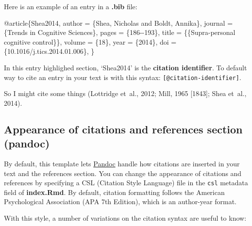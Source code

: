 \documentclass[a4paper, nobind]{templates/ociamthesis}
\newenvironment{Shaded}{\begin{snugshade}}{\end{snugshade}}
\newcommand{\DataTypeTok}[1]{\textcolor[rgb]{0.13,0.29,0.53}{#1}}
\newcommand{\NormalTok}[1]{#1}
\newcommand{\OtherTok}[1]{\textcolor[rgb]{0.56,0.35,0.01}{#1}}
\newcommand{\VariableTok}[1]{\textcolor[rgb]{0.00,0.00,0.00}{#1}}
\renewenvironment{Shaded}
{
  \vspace{10pt}%
  \begin{snugshade}%
}{%
  \end{snugshade}%
  \vspace{8pt}%
}
\providecommand{\citeproc}[2]{#2}
\begin{document}
Here is an example of an entry in a \textbf{.bib} file:

\begin{Shaded}
\begin{Highlighting}[]
\VariableTok{@article}\NormalTok{\{}\OtherTok{Shea2014}\NormalTok{,}
  \DataTypeTok{author}\NormalTok{ =        \{Shea, Nicholas and Boldt, Annika\},}
  \DataTypeTok{journal}\NormalTok{ =       \{Trends in Cognitive Sciences\},}
  \DataTypeTok{pages}\NormalTok{ =         \{186{-}{-}193\},}
  \DataTypeTok{title}\NormalTok{ =         \{\{Supra{-}personal cognitive control\}\},}
  \DataTypeTok{volume}\NormalTok{ =        \{18\},}
  \DataTypeTok{year}\NormalTok{ =          \{2014\},}
  \DataTypeTok{doi}\NormalTok{ =           \{10.1016/j.tics.2014.01.006\},}
\NormalTok{\}}
\end{Highlighting}
\end{Shaded}

In this entry highlighed section, `Shea2014' is the \textbf{citation identifier}.
To default way to cite an entry in your text is with this syntax: \texttt{{[}@citation-identifier{]}}.

So I might cite some things (\citeproc{ref-Lottridge2012}{Lottridge et~al., 2012}; \citeproc{ref-Mill1965}{Mill, 1965 {[}1843{]}}; \citeproc{ref-Shea2014}{Shea et~al., 2014}).

\subsection{Appearance of citations and references section (pandoc)}\label{citation-appearance}

By default, this template lets \href{https://pandoc.org}{Pandoc} handle how citations are inserted in your text and the references section.
You can change the appearance of citations and references by specifying a CSL (Citation Style Language) file in the \texttt{csl} metadata field of \textbf{index.Rmd}.
By default, citation formatting follows the American Psychological Association (APA 7th Edition), which is an author-year format.

With this style, a number of variations on the citation syntax are useful to know:
\end{document}
